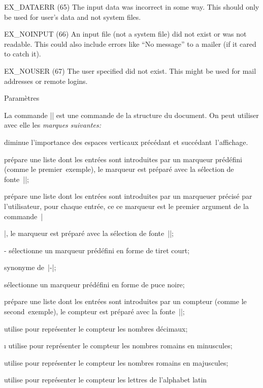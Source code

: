 \item{EX\_DATAERR (65)}
The input data was incorrect in some way.  This should only be used
for user's data and not system files.

\item{EX\_NOINPUT (66)}
An input file (not a system file) did not exist or was not readable.
This could also include errors like ``No message'' to a mailer (if it
cared to catch it).

\item{EX\_NOUSER (67)}
The user specified did not exist.  This might be used for mail
addresses or remote logins.
\endlist
\endcode

\formalpar Paramètres

La commande |\beginlist| est une commande de la structure du
document. On peut utiliser avec elle les \em{marques} suivantes:
\begincslist
\item\compact
 diminue l'importance des espaces verticaux précédant et
 succédant~l'affichage.
\medskip
\item\marker
 prépare une liste dont les entrées sont introduites par un marqueur
 prédéfini (comme le premier~exemple), le marqueur est préparé avec la
 sélection de fonte~|\listmarkfont|;
\item\item
 prépare une liste dont les entrées sont introduites par un marqueuer
 précisé par l'utilisateur, pour chaque entrée, ce ce marqueur est le
 premier argument de la commande~|\item|, le marqueur est préparé avec la
 sélection de fonte~|\listmarkfont|;
\item\hyphen
 sélectionne un marqueur prédéfini en forme de tiret court;
\item\dash
 synonyme de~|\hyphen|;
\item\bullet
 sélectionne un marqueur prédéfini en forme de puce noire;
\medskip
\item\enum
 prépare une liste dont les entrées sont introduites par un compteur
 (comme le second~exemple), le compteur est préparé avec la
 fonte~|\listmarkfont|;
\item\1
 utilise pour représenter le compteur les nombres décimaux;
\item\i
 utilise pour représenter le compteur les nombres romains en minuscules;
\item\I
 utilise pour représenter le compteur les nombres romains en majuscules;
\item\a
 utilise pour représenter le compteur les lettres de l'alphabet latin
